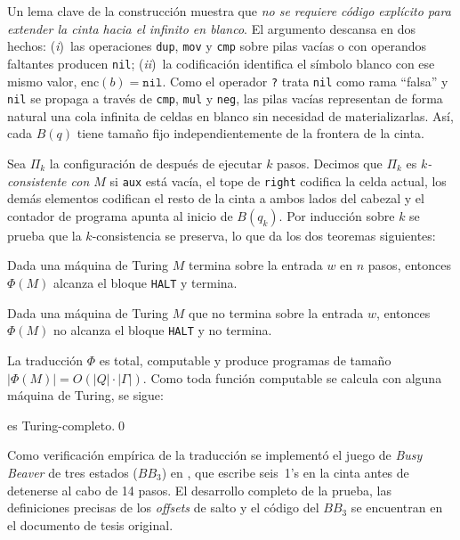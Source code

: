 Un lema clave de la construcci\'on muestra que \emph{no se requiere
c\'odigo expl\'icito para extender la cinta hacia el infinito en blanco}.
El argumento descansa en dos hechos: (\textit{i})~las operaciones
\texttt{dup}, \texttt{mov} y \texttt{cmp} sobre pilas vac\'ias o con
operandos faltantes producen \texttt{nil}; (\textit{ii})~la
codificaci\'on identifica el s\'imbolo blanco con ese mismo valor, \ie
$\mathrm{enc}(b) = \texttt{nil}$. Como el operador \texttt{?} trata
\texttt{nil} como rama ``falsa'' y \texttt{nil} se propaga a trav\'es de
\texttt{cmp}, \texttt{mul} y \texttt{neg}, las pilas vac\'ias representan
de forma natural una cola infinita de celdas en blanco sin necesidad de
materializarlas. As\'i, cada $B(q)$ tiene tama\~no fijo independientemente
de la frontera de la cinta.

Sea $\Pi_k$ la configuraci\'on de \sculpt despu\'es de ejecutar $k$
pasos. Decimos que $\Pi_k$ es \emph{$k$-consistente con $M$} si
\texttt{aux} est\'a vac\'ia, el tope de \texttt{right} codifica la
celda actual, los dem\'as elementos codifican el resto de la cinta a
ambos lados del cabezal y el contador de programa apunta al inicio de
$B(q_k)$. Por inducci\'on sobre $k$ se prueba que la $k$-consistencia
se preserva, lo que da los dos teoremas siguientes:

\begin{thm}
\label{thm:halting}
Dada una m\'aquina de Turing $M$ termina sobre la entrada $w$ en $n$ pasos, entonces $\Phi(M)$
alcanza el bloque \texttt{HALT} y termina.
\end{thm}

\begin{thm}
\label{thm:nonhalt}
Dada una m\'aquina de Turing $M$ que no termina sobre la entrada $w$, entonces $\Phi(M)$ no alcanza el bloque \texttt{HALT} y no termina.
\end{thm}

La traducci\'on $\Phi$ es total, computable y produce programas de
tama\~no $|\Phi(M)| = O(|Q| \cdot |\Gamma|)$. Como toda funci\'on
computable se calcula con alguna m\'aquina de Turing, se sigue:

\begin{thm}
\sculpt es Turing-completo.\qed
\end{thm}

Como verificaci\'on emp\'irica de la traducci\'on se implement\'o el juego de
\emph{Busy Beaver} de tres estados (\(BB_3\)) en \sculpt, que escribe
seis~1's en la cinta antes de detenerse al cabo de 14 pasos. El
desarrollo completo de la prueba, las definiciones precisas de los
\emph{offsets} de salto y el c\'odigo del $BB_3$ se encuentran en el
documento de tesis original.

